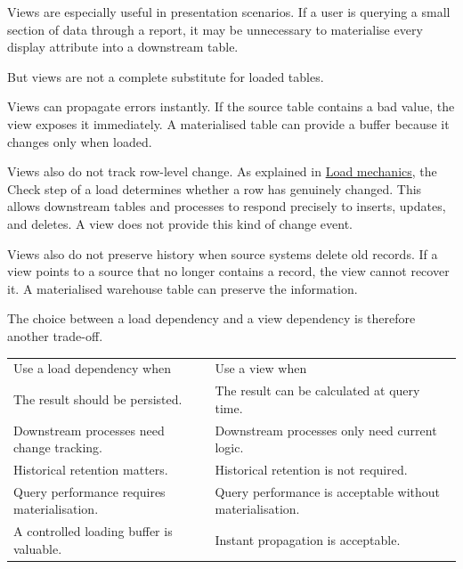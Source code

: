 \documentclass[10pt,openany,10pt]{book}
\newcounter{none}
\let\podeToprule\toprule
\let\podeMidrule\midrule
\let\podeBottomrule\bottomrule
\renewcommand{\toprule}{\arrayrulecolor{pbiGrid}\podeToprule}
\renewcommand{\midrule}{\arrayrulecolor{pbiGrid}\podeMidrule}
\renewcommand{\bottomrule}{\arrayrulecolor{pbiGrid}\podeBottomrule}
\begin{document}
Views are especially useful in presentation scenarios. If a user is
querying a small section of data through a report, it may be unnecessary
to materialise every display attribute into a downstream table.

But views are not a complete substitute for loaded tables.

Views can propagate errors instantly. If the source table contains a bad
value, the view exposes it immediately. A materialised table can provide
a buffer because it changes only when loaded.

Views also do not track row-level change. As explained in
\hyperref[docs-efficient-stable-pipeline-load-mechanics]{Load
mechanics}, the Check step of a load determines whether a row has
genuinely changed. This allows downstream tables and processes to
respond precisely to inserts, updates, and deletes. A view does not
provide this kind of change event.

Views also do not preserve history when source systems delete old
records. If a view points to a source that no longer contains a record,
the view cannot recover it. A materialised warehouse table can preserve
the information.

The choice between a load dependency and a view dependency is therefore
another trade-off.

{\def\LTcaptype{none} %
\begin{longtable}[]{@{}
  >{\raggedright\arraybackslash}p{}
  >{\raggedright\arraybackslash}p{}@{}}
\toprule\noalign{}
\begin{minipage}[b]{\linewidth}\raggedright
Use a load dependency when
\end{minipage} & \begin{minipage}[b]{\linewidth}\raggedright
Use a view when
\end{minipage} \\
\midrule\noalign{}
\endhead
\bottomrule\noalign{}
\endlastfoot
The result should be persisted. & The result can be calculated at query
time. \\
Downstream processes need change tracking. & Downstream processes only
need current logic. \\
Historical retention matters. & Historical retention is not required. \\
Query performance requires materialisation. & Query performance is
acceptable without materialisation. \\
A controlled loading buffer is valuable. & Instant propagation is
acceptable. \\
\end{longtable}
}
\end{document}

